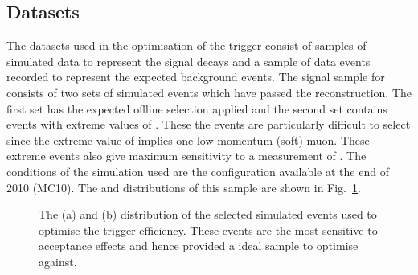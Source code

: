 \subsection{Datasets}
\label{sec:trigdev:data}

The datasets used in the optimisation of the trigger consist of samples of simulated data to represent the signal decays
and a sample of data events recorded to represent the expected background events.
The signal sample for \BdToKstmm consists of two sets of simulated events which have passed the \lhcb reconstruction. 
The first set has the expected offline selection applied and the second set contains events with extreme values of \ctl. 
These the events are particularly difficult to select since the extreme value of \ctl implies one low-momentum (soft) muon.
These extreme \ctl events also give maximum sensitivity to a measurement of \AFB.
 The conditions of the simulation used are the configuration available at the end of 2010 (MC10). 
The \ctl and \qsq distributions of this sample are shown in Fig.~\ref{fig:trigdev:kstmm}.
\begin{figure}[tbp]
\centering
{}
\caption[\BdToKstmm simulated events used to optimise the trigger.]
{ The (a) \ctl and (b) \qsq distribution of the selected \BdToKstmm simulated events used to optimise the trigger efficiency. These events are the most sensitive 
to acceptance effects and hence provided a ideal sample to optimise against.~\label{fig:trigdev:kstmm} }
\end{figure}

